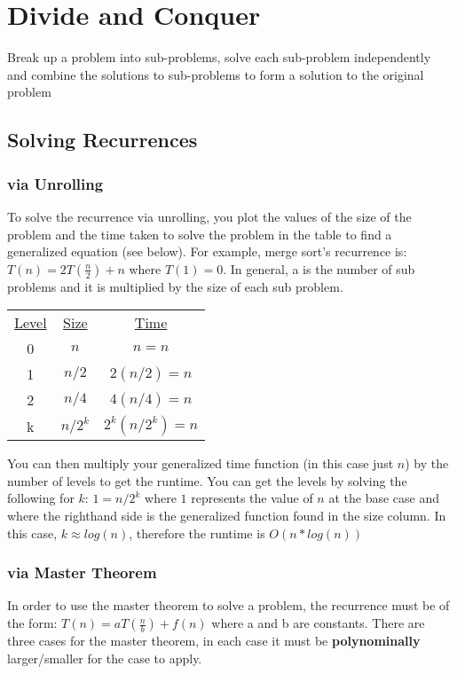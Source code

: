 \documentclass{article}
\begin{document}
\section{Divide and Conquer}
Break up a problem into sub-problems, solve each sub-problem independently and combine the solutions to sub-problems to form a
solution to the original problem
\subsection{Solving Recurrences}
\subsubsection{via Unrolling}
To solve the recurrence via unrolling, you plot the values of the size of the problem and
the time taken to solve the problem in the table to find a generalized equation (see below). For example,
merge sort's recurrence is: $T(n) = 2T(\frac{n}{2}) + n$ where $T(1) = 0$. In general, a is
the number of sub problems and it is multiplied by the size of each sub problem. 

\begin{multicols}{2}
\begin{center}
    \begin{tabular}{c c c}
        \underline{Level} & \underline{Size} & \underline{Time} \\
        0 & $n$ & $n = n$ \\
        1 & $n/2$ & $2(n/2) = n$ \\
        2 & $n/4$ & $4(n/4) = n$ \\
        k & $n/2^k$ & $2^k(n/2^k) = n$ \\
    \end{tabular}
\end{center}
\columnbreak
You can then multiply your generalized time function (in this case just $n$) by the number of levels
to get the runtime. You can get the levels by solving the following for $k$: $1 = n/2^k$ where $1$ represents the value of $n$
at the base case and where the righthand side is the generalized function found in the size column.
In this case, $k \approx log(n)$, therefore the runtime is $O(n*log(n))$
\end{multicols}
\subsubsection{via Master Theorem}
In order to use the master theorem to solve a problem, the recurrence must be of the form:
$T(n) = aT(\frac{n}{b})+f(n)$ where a and b are constants.
There are three cases for the master theorem, in each case it must be \textbf{polynominally} larger/smaller for the case to apply.
\end{document}

